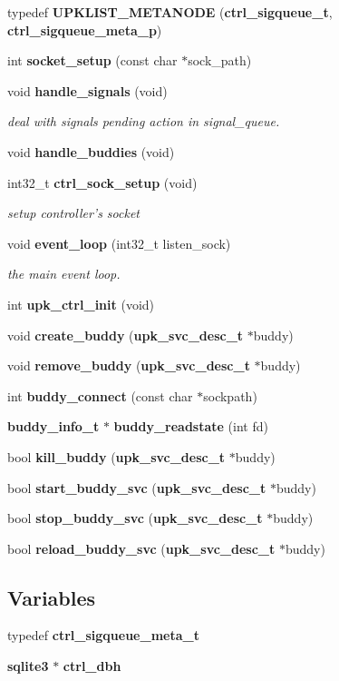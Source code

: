 \begin{DoxyCompactItemize}
\item 
typedef {\bf UPKLIST\_\-METANODE} ({\bf ctrl\_\-sigqueue\_\-t}, {\bf ctrl\_\-sigqueue\_\-meta\_\-p})
\item 
int {\bf socket\_\-setup} (const char $\ast$sock\_\-path)
\item 
void {\bf handle\_\-signals} (void)
\begin{DoxyCompactList}\small\item\em deal with signals pending action in signal\_\-queue. \end{DoxyCompactList}\item 
void {\bf handle\_\-buddies} (void)
\item 
int32\_\-t {\bf ctrl\_\-sock\_\-setup} (void)
\begin{DoxyCompactList}\small\item\em setup controller's socket \end{DoxyCompactList}\item 
void {\bf event\_\-loop} (int32\_\-t listen\_\-sock)
\begin{DoxyCompactList}\small\item\em the main event loop. \end{DoxyCompactList}\item 
int {\bf upk\_\-ctrl\_\-init} (void)
\item 
void {\bf create\_\-buddy} ({\bf upk\_\-svc\_\-desc\_\-t} $\ast$buddy)
\item 
void {\bf remove\_\-buddy} ({\bf upk\_\-svc\_\-desc\_\-t} $\ast$buddy)
\item 
int {\bf buddy\_\-connect} (const char $\ast$sockpath)
\item 
{\bf buddy\_\-info\_\-t} $\ast$ {\bf buddy\_\-readstate} (int fd)
\item 
bool {\bf kill\_\-buddy} ({\bf upk\_\-svc\_\-desc\_\-t} $\ast$buddy)
\item 
bool {\bf start\_\-buddy\_\-svc} ({\bf upk\_\-svc\_\-desc\_\-t} $\ast$buddy)
\item 
bool {\bf stop\_\-buddy\_\-svc} ({\bf upk\_\-svc\_\-desc\_\-t} $\ast$buddy)
\item 
bool {\bf reload\_\-buddy\_\-svc} ({\bf upk\_\-svc\_\-desc\_\-t} $\ast$buddy)
\end{DoxyCompactItemize}
\subsection*{Variables}
\begin{DoxyCompactItemize}
\item 
typedef {\bf ctrl\_\-sigqueue\_\-meta\_\-t}
\item 
{\bf sqlite3} $\ast$ {\bf ctrl\_\-dbh}
\end{DoxyCompactItemize}


